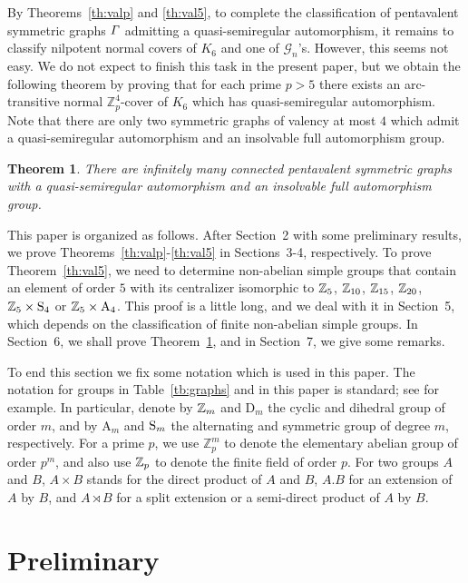 \documentclass[12pt,reqno]{amsart}
\newcommand\A{\mathrm{A}} \newcommand\AGL{\mathrm{AGL}} \newcommand\AGammaL{\mathrm{A\Gamma L}} \newcommand\Alt{\mathrm{Alt}} \newcommand\ASL{\mathrm{ASL}} \newcommand\ASigmaL{\mathrm{A \Sigma L}} \newcommand\Aut{\mathrm{Aut}}
\newcommand\D{\mathrm{D}}   \def\det{{\sf det}}
\newcommand\mz{\mathbb{Z}}
\newcommand{\cG}{\mathcal{G}}
\numberwithin {equation} {section}
\newtheorem{theorem}{Theorem}[section]
\begin{document}
By Theorems~\ref{th:valp} and \ref{th:val5}, to complete the classification of pentavalent symmetric graphs ${\it \Gamma}$ admitting a quasi-semiregular automorphism, it remains to classify nilpotent normal covers of $K_6$ and one of $\cG_n$'s. However, this seems not easy. We do not expect to finish this task in the present paper, but we obtain the following theorem by proving that for each prime $p>5$ there exists an arc-transitive normal $\mz_p^4$-cover of $K_6$ which has quasi-semiregular automorphism.  Note that there are only two symmetric graphs of valency at most $4$ which admit a quasi-semiregular automorphism and an insolvable full automorphism group.

\begin{theorem}\label{th:infinite}
There are infinitely many connected pentavalent symmetric graphs with a quasi-semiregular automorphism and an insolvable full automorphism group.
\end{theorem}

This paper is organized as follows. After Section~2 with some preliminary results, we prove Theorems~\ref{th:valp}-\ref{th:val5} in Sections~3-4, respectively. To prove Theorem~\ref{th:val5}, we need to determine non-abelian simple groups that contain an element of order $5$ with its centralizer isomorphic to $\mathbb{Z}_5$, $\mathbb{Z}_{10}$, $\mathbb{Z}_{15}$, $\mathbb{Z}_{20}$, $\mathbb{Z}_5 \times\mathrm{S}_4$ or $\ZZ_5 \times \A_4$. This proof is a little long, and we deal with it in Section~5, which depends on the classification of finite non-abelian simple groups. In Section~6, we shall prove Theorem~\ref{th:infinite}, and in Section~7, we give some remarks.

To end this section we fix some notation which is used in this paper. The notation for groups in Table~\ref{tb:graphs} and in this paper is standard; see \cite{Atlas} for example. In particular, denote by $\mathbb{Z}_{m}$ and $\D_{m}$ the cyclic and dihedral group of order $m$, and by $\A_m$ and $\mathrm{S}_m$ the alternating and symmetric group of degree $m$, respectively. For a prime $p$,  we use $\mz_p^m$ to denote the elementary abelian group of order $p^m$, and also use $\mathbb{Z}_{p}$ to denote the finite field of order $p$. For two groups $A$ and $B$, $A\times B$ stands for the direct product of $A$ and $B$, $A.B$ for an extension of $A$ by $B$, and $A\rtimes B$ for a split extension or a semi-direct product of $A$ by $B$.


\section{Preliminary}\label{sec:pre}
\end{document}
